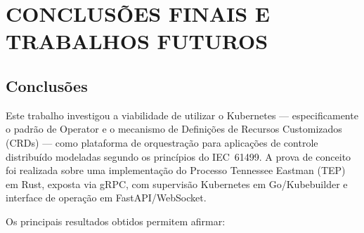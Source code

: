 \chapter[CONCLUSÕES FINAIS E TRABALHOS FUTUROS]{CONCLUSÕES FINAIS E TRABALHOS FUTUROS}
\label{cha:conclusao}

\section{Conclusões}
\label{sec:conclusoes}

Este trabalho investigou a viabilidade de utilizar o Kubernetes — especificamente o padrão de Operator e o mecanismo de Definições de Recursos Customizados (CRDs) — como plataforma de orquestração para aplicações de controle distribuído modeladas segundo os princípios do IEC~61499. A prova de conceito foi realizada sobre uma implementação do Processo Tennessee Eastman (TEP) em Rust, exposta via gRPC, com supervisão Kubernetes em Go/Kubebuilder e interface de operação em FastAPI/WebSocket.

Os principais resultados obtidos permitem afirmar:

